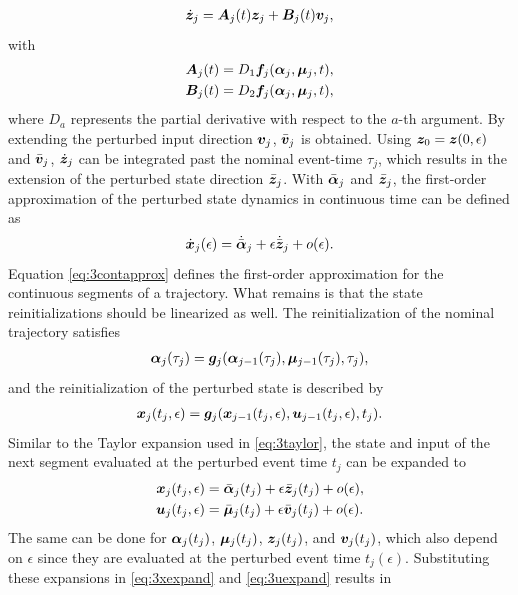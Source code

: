 \documentclass[../DC2019003Bouma.tex]{subfiles}
\begin{document}
\begin{align}
\dot{{\boldsymbol{z}}}_j = {\boldsymbol{A}}_j(t){\boldsymbol{z}}_j +{\boldsymbol{B}}_j(t){\boldsymbol{v}}_j,\label{eq:3zdot}
\end{align}
with
\begin{align}
{\boldsymbol{A}}_j(t) &= D_1{\boldsymbol{f}}_j(\boldsymbol{\alpha}_j,\boldsymbol{\mu}_j,t),\\
{\boldsymbol{B}}_j(t) &= D_2{\boldsymbol{f}}_j(\boldsymbol{\alpha}_j,\boldsymbol{\mu}_j,t),
\end{align}
where $D_a$ represents the partial derivative with respect to the $a$-th argument. By extending the perturbed input direction ${\boldsymbol{v}}_j$, $\bar{{\boldsymbol{v}}}_j$ is obtained. Using ${\boldsymbol{z}}_0={\boldsymbol{z}}(0,\epsilon)$ and $\bar{{\boldsymbol{v}}}_j$, $\dot{{\boldsymbol{z}}}_j$ can be integrated past the nominal event-time $\tau_j$, which results in the extension of the perturbed state direction $\bar{{\boldsymbol{z}}}_j$. With $\bar{\boldsymbol{\alpha}}_j$ and $\bar{{\boldsymbol{z}}}_j$, the first-order approximation of the perturbed state dynamics in continuous time can be defined as
\begin{align}
\dot{{\boldsymbol{x}}}_j(\epsilon) = \dot{\bar{\boldsymbol{\alpha}}}_j + \epsilon\dot{\bar{{\boldsymbol{z}}}}_j + o(\epsilon).\label{eq:3contapprox}
\end{align}
Equation \eqref{eq:3contapprox} defines the first-order approximation for the continuous segments of a trajectory. What remains is that the state reinitializations should be linearized as well. The reinitialization of the nominal trajectory satisfies
\begin{align}
\boldsymbol{\alpha}_{j}(\tau_{j}) = {\boldsymbol{g}}_{j}(\boldsymbol{\alpha}_{j-1}(\tau_{j}),\boldsymbol{\mu}_{j-1}(\tau_{j}),\tau_{j}),\label{eq:3g}
\end{align}
and the reinitialization of the perturbed state is described by
\begin{align}
{\boldsymbol{x}}_{j}(t_{j},\epsilon) = {\boldsymbol{g}}_{j}({\boldsymbol{x}}_{j-1}(t_{j},\epsilon),{\boldsymbol{u}}_{j-1}(t_{j},\epsilon),t_{j}).\label{eq:3gpert}
\end{align}
Similar to the Taylor expansion used in \eqref{eq:3taylor}, the state and input of the next segment evaluated at the perturbed event time $t_{j}$ can be expanded to
\begin{align}
{\boldsymbol{x}}_j(t_{j},\epsilon) &= \bar{\boldsymbol{\alpha}}_j(t_{j}) + \epsilon\bar{{\boldsymbol{z}}}_j(t_{j}) + o(\epsilon),\label{eq:3xexpand}\\
{\boldsymbol{u}}_j(t_{j},\epsilon) &= \bar{\boldsymbol{\mu}}_j(t_{j}) + \epsilon\bar{{\boldsymbol{v}}}_j(t_{j}) + o(\epsilon).\label{eq:3uexpand}
\end{align}
The same can be done for $\boldsymbol{\alpha}_j(t_{j})$, $\boldsymbol{\mu}_j(t_{j})$, ${\boldsymbol{z}}_j(t_{j})$, and ${\boldsymbol{v}}_j(t_{j})$, which also depend on $\epsilon$ since they are evaluated at the perturbed event time $t_j(\epsilon)$. Substituting these expansions in \eqref{eq:3xexpand} and \eqref{eq:3uexpand} results in
\end{document}
